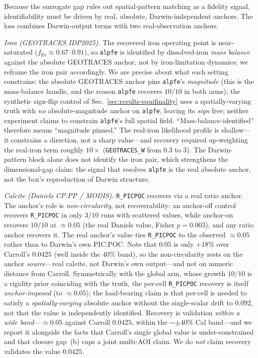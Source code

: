 \documentclass[11pt]{article}
\begin{document}
Because the surrogate gap rules out spatial-pattern matching as a fidelity signal, identifiability must be driven by real, absolute, Darwin-independent anchors. The loss combines Darwin-output terms with two real-observation anchors.

\emph{Iron (GEOTRACES IDP2025).} The recovered iron operating point is near-saturated ($f_{\mathrm{Fe}} \approx 0.67$--$0.91$), so \texttt{alpfe} is identified by dissolved-iron \emph{mass balance} against the absolute GEOTRACES anchor, not by iron-limitation dynamics; we reframe the iron pair accordingly. We are precise about what each setting constrains: the absolute GEOTRACES anchor pins \texttt{alpfe}'s \emph{magnitude} (this is the mass-balance handle, and the reason \texttt{alpfe} recovers $10/10$ in both arms); the synthetic sign-flip control of Sec.~\ref{sec:results-equifinality} uses a spatially-varying truth with \emph{no} absolute-magnitude anchor on \texttt{alpfe}, leaving its \emph{sign} free; neither experiment claims to constrain \texttt{alpfe}'s full spatial field. ``Mass-balance-identified'' therefore means ``magnitude pinned.'' The real-iron likelihood profile is shallow---it constrains a direction, not a sharp value---and recovery required up-weighting the real-iron term roughly $10\times$ (\texttt{GEOTRACES\_W} from $0.3$ to $3$). The Darwin-pattern block alone does not identify the iron pair, which strengthens the dimensional-gap claim: the signal that resolves \texttt{alpfe} is the real absolute anchor, not the box's reproduction of Darwin structure.

\emph{Calcite (Daniels CP:PP / MODIS).} \texttt{R\_PICPOC} recovers via a real ratio anchor. The anchor's role is \emph{non-circularity}, not recoverability: an anchor-off control recovers \texttt{R\_PICPOC} in only $3/10$ runs with scattered values, while anchor-on recovers $10/10$ at $\approx 0.05$ (the real Daniels value, Fisher $p=0.003$), and any ratio anchor recovers it. The real anchor's value ties \texttt{R\_PICPOC} to the observed $\approx 0.05$ rather than to Darwin's own PIC:POC. Note that $0.05$ is only $+18\%$ over Carroll's $0.0425$ (well inside the $40\%$ band), so the non-circularity rests on the anchor \emph{source}---real calcite, not Darwin's own output---and not on numeric distance from Carroll. Symmetrically with the global arm, whose growth $10/10$ is a rigidity prior coinciding with the truth, the per-cell \texttt{R\_PICPOC} recovery is itself \emph{anchor-imposed} (to $\approx0.05$); the load-bearing claim is that per-cell is needed to satisfy a \emph{spatially-varying} absolute anchor without the single-scalar drift to $0.092$, not that the value is independently identified. Recovery is validation \emph{within a wide band}---$\approx 0.05$ against Carroll $0.0425$, within the $\sim\pm40\%$ Cal band---and we report it alongside the facts that Carroll's single global value is under-constrained and that closure gap~(b) caps a joint multi-AOI claim. We do \emph{not} claim recovery validates the value $0.0425$.
\end{document}
